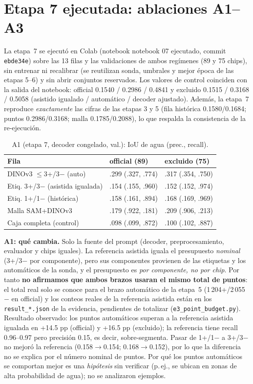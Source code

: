 \documentclass[11pt,twocolumn,a4paper]{article}
\begin{document}
\section{Etapa 7 ejecutada: ablaciones A1--A3}
La etapa~7 se ejecut\'o en Colab (notebook notebook 07 ejecutado, commit \texttt{ebde34e}) sobre las 13 filas y las validaciones de ambos reg\'imenes (89 y 75 chips), sin entrenar ni recalibrar (se reutilizan sonda, umbrales y mejor \'epoca de las etapas 5--6) y sin abrir conjuntos reservados. Los valores de control coinciden con la salida del notebook: official 0.1540 / 0.2986 / 0.4841 y excluido 0.1515 / 0.3168 / 0.5058 (asistido igualado / autom\'atico / decoder ajustado). Adem\'as, la etapa~7 reproduce \emph{exactamente} las cifras de las etapas 3 y 5 (fila hist\'orica 0.1580/0.1684; puntos 0.2986/0.3168; malla 0.1785/0.2088), lo que respalda la consistencia de la re-ejecuci\'on.
\begin{table}[h]\centering\scriptsize\caption{A1 (etapa 7, decoder congelado, val.): IoU de agua (prec., recall).}
\begin{tabular}{@{}p{2.6cm}p{2.5cm}p{2.5cm}@{}}\toprule
Fila & official (89) & excluido (75)\\\midrule
DINOv3 $\le$3+/3$-$ (auto) & .299 (.327, .774) & .317 (.354, .750)\\
Etiq. 3+/3$-$ (asistida igualada) & .154 (.155, .960) & .152 (.152, .974)\\
Etiq. 1+/1$-$ (hist\'orica) & .158 (.161, .894) & .168 (.169, .969)\\
Malla SAM+DINOv3 & .179 (.922, .181) & .209 (.906, .213)\\
Caja completa (control) & .098 (.099, .872) & .100 (.102, .887)\\
\bottomrule\end{tabular}\end{table}
\textbf{A1: qu\'e cambia.} Solo la fuente del prompt (decoder, preprocesamiento, evaluador y chips iguales). La referencia asistida iguala el presupuesto \emph{nominal} (3+/3$-$ por componente), pero sus componentes provienen de las etiquetas y los autom\'aticos de la sonda, y el presupuesto es \emph{por componente, no por chip}. Por tanto \textbf{no afirmamos que ambos brazos usaran el mismo total de puntos}: el total real solo se conoce para el brazo autom\'atico de la etapa~5 (1\,204+/2\,055$-$ en official) y los conteos reales de la referencia asistida est\'an en los \texttt{result\_*.json} de la evidencia, pendientes de totalizar (\texttt{e3\_point\_budget.py}). Resultado observado: los puntos autom\'aticos superan a la referencia asistida igualada en +14.5 pp (official) y +16.5 pp (excluido); la referencia tiene recall 0.96--0.97 pero precisi\'on 0.15, es decir, sobre-segmenta. Pasar de 1+/1$-$ a 3+/3$-$ no mejor\'o la referencia (0.158$\to$0.154; 0.168$\to$0.152), por lo que la diferencia no se explica por el n\'umero nominal de puntos. Por qu\'e los puntos autom\'aticos se comportan mejor es una \emph{hip\'otesis} sin verificar (p.\,ej., se ubican en zonas de alta probabilidad de agua); no se analizaron ejemplos.
\end{document}
